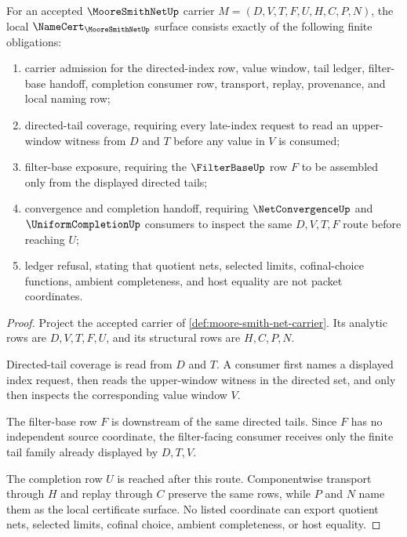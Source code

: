\begin{theorem}\label{thm:moore-smith-net-namecert-obligations}
For an accepted $\MooreSmithNetUp$ carrier $M=(D,V,T,F,U,H,C,P,N)$, the local $\NameCert_{\MooreSmithNetUp}$ surface consists exactly of the following finite obligations:
\begin{enumerate}
\item carrier admission for the directed-index row, value window, tail ledger, filter-base handoff, completion consumer row, transport, replay, provenance, and local naming row;
\item directed-tail coverage, requiring every late-index request to read an upper-window witness from $D$ and $T$ before any value in $V$ is consumed;
\item filter-base exposure, requiring the $\FilterBaseUp$ row $F$ to be assembled only from the displayed directed tails;
\item convergence and completion handoff, requiring $\NetConvergenceUp$ and $\UniformCompletionUp$ consumers to inspect the same $D,V,T,F$ route before reaching $U$;
\item ledger refusal, stating that quotient nets, selected limits, cofinal-choice functions, ambient completeness, and host equality are not packet coordinates.
\end{enumerate}
\end{theorem}
\begin{proof}
Project the accepted carrier of \autoref{def:moore-smith-net-carrier}. Its analytic rows are $D,V,T,F,U$, and its structural rows are $H,C,P,N$.

Directed-tail coverage is read from $D$ and $T$. A consumer first names a displayed index request, then reads the upper-window witness in the directed set, and only then inspects the corresponding value window $V$.

The filter-base row $F$ is downstream of the same directed tails. Since $F$ has no independent source coordinate, the filter-facing consumer receives only the finite tail family already displayed by $D,T,V$.

The completion row $U$ is reached after this route. Componentwise transport through $H$ and replay through $C$ preserve the same rows, while $P$ and $N$ name them as the local certificate surface. No listed coordinate can export quotient nets, selected limits, cofinal choice, ambient completeness, or host equality.
\end{proof}

